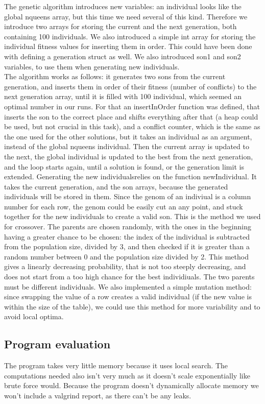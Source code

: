 \documentclass{article}
\begin{document}
The genetic algorithm introduces new variables: an individual looks like the global nqueens array, but this time we need several of this kind. Therefore we introduce two arrays for storing the current and the next generation, both containing 100 individuals. We also introduced a simple int array for storing the individual fitness values for inserting them in order. This could have been done with defining a generation struct as well. We also introduced son1 and son2 variables, to use them when generating new individuals.\\
The algorithm works as follows: it generates two sons from the current generation, and inserts them in order of their fitness (number of conflicts) to the next generation array, until it is filled with 100 individual, which seemed an optimal number in our runs. For that an insertInOrder function was defined, that inserts the son to the correct place and shifts everything after that (a heap could be used, but not crucial in this task), and a conflict counter, which is the same as the one used for the other solutions, but it takes an individual as an argument, instead of the global nqueens individual. Then the current array is updated to the next, the global individual is updated to the best from the next generation, and the loop starts again, until a solution is found, or the generation limit is extended.
Generating the new individualsrelies on the function newIndividual. It takes the current generation, and the son arrays, because the generated individuals will be stored in them. Since the genom of an indiviual is a column number for each row, the genom could be easily cut an any point, and stuck together for the new individuals to create a valid son. This is the method we used for crossover. The parents are chosen randomly, with the ones in the beginning having a greater chance to be chosen: the index of the individual is subtracted from the population size, divided by 3, and then checked if it is greater than a random number between 0 and the population size divided by 2. This method gives a linearly decreasing probability, that is not too steeply decreasing, and does not start from a too high chance for the best individiuals. The two parents must be different individuals.
We also implemented a simple mutation method: since swapping the value of a row creates a valid individual (if the new value is within the size of the table), we could use this method for more variability and to avoid local optima.


\subsection*{Program evaluation}
The program takes very little memory because it uses local search. The computations needed also isn't very much as it doesn't scale exponentially like brute force would. Because the program doesn't dynamically allocate memory we won't include a valgrind report, as there can't be any leaks.
\end{document}
